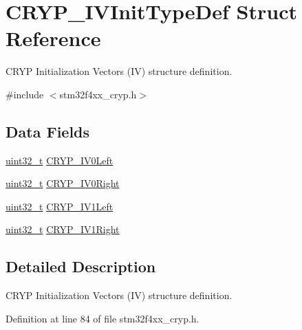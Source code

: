 \hypertarget{struct_c_r_y_p___i_v_init_type_def}{\section{C\-R\-Y\-P\-\_\-\-I\-V\-Init\-Type\-Def Struct Reference}
\label{struct_c_r_y_p___i_v_init_type_def}
}


C\-R\-Y\-P Initialization Vectors (I\-V) structure definition.  




{\ttfamily \#include $<$stm32f4xx\-\_\-cryp.\-h$>$}

\subsection*{Data Fields}
\begin{DoxyCompactItemize}
\item 
\hyperlink{stdint_8h_a435d1572bf3f880d55459d9805097f62}{uint32\-\_\-t} \hyperlink{struct_c_r_y_p___i_v_init_type_def_a36a3734747b9c32e2cde67cb54be02f8}{C\-R\-Y\-P\-\_\-\-I\-V0\-Left}
\item 
\hyperlink{stdint_8h_a435d1572bf3f880d55459d9805097f62}{uint32\-\_\-t} \hyperlink{struct_c_r_y_p___i_v_init_type_def_ad7128fb8cf3843c2e0f89cf048cd28d5}{C\-R\-Y\-P\-\_\-\-I\-V0\-Right}
\item 
\hyperlink{stdint_8h_a435d1572bf3f880d55459d9805097f62}{uint32\-\_\-t} \hyperlink{struct_c_r_y_p___i_v_init_type_def_a5edca0a5d021ee77fcfcdf9e29e27a53}{C\-R\-Y\-P\-\_\-\-I\-V1\-Left}
\item 
\hyperlink{stdint_8h_a435d1572bf3f880d55459d9805097f62}{uint32\-\_\-t} \hyperlink{struct_c_r_y_p___i_v_init_type_def_a936f532460c581298620960b511aa448}{C\-R\-Y\-P\-\_\-\-I\-V1\-Right}
\end{DoxyCompactItemize}


\subsection{Detailed Description}
C\-R\-Y\-P Initialization Vectors (I\-V) structure definition. 

Definition at line 84 of file stm32f4xx\-\_\-cryp.\-h.




